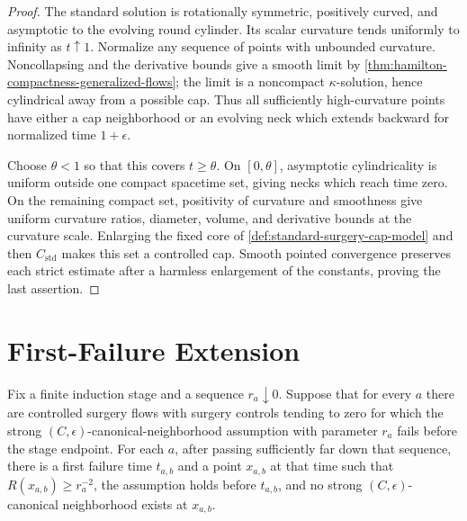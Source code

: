 \begin{proof}
The standard solution is rotationally symmetric, positively curved, and
asymptotic to the evolving round cylinder.  Its scalar curvature tends
uniformly to infinity as $t\uparrow1$.  Normalize any sequence of points with
unbounded curvature.  Noncollapsing and the derivative bounds give a smooth
limit by \ref{thm:hamilton-compactness-generalized-flows}; the limit is a
noncompact $\kappa$-solution, hence cylindrical away from a possible cap.
Thus all sufficiently high-curvature points have either a cap neighborhood
or an evolving neck which extends backward for normalized time
$1+\epsilon$.

Choose $\theta<1$ so that this covers $t\ge\theta$.  On
$[0,\theta]$, asymptotic cylindricality is uniform outside one compact
spacetime set, giving necks which reach time zero.  On the remaining compact
set, positivity of curvature and smoothness give uniform curvature ratios,
diameter, volume, and derivative bounds at the curvature scale.  Enlarging
the fixed core of \ref{def:standard-surgery-cap-model} and then
$C_{\mathrm{std}}$
makes this set a controlled cap.  Smooth pointed convergence preserves each
strict estimate after a harmless enlargement of the constants, proving the
last assertion.
\end{proof}

\section{First-Failure Extension}

\begin{lemma}
\label{lem:canonical-neighborhood-first-failure}
\notready
Fix a finite induction stage and a sequence $r_a\downarrow0$.  Suppose that
for every $a$ there are controlled surgery flows with surgery controls
tending to zero for which the strong $(C,\epsilon)$-canonical-neighborhood
assumption with parameter $r_a$ fails before the stage endpoint.  For each
$a$, after passing sufficiently far down that sequence, there is a first
failure time $t_{a,b}$ and a point $x_{a,b}$ at that time such that
$R(x_{a,b})\ge r_a^{-2}$, the assumption holds before $t_{a,b}$, and no
strong $(C,\epsilon)$-canonical neighborhood exists at $x_{a,b}$.
\end{lemma}

